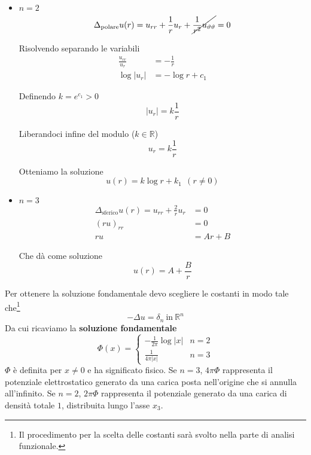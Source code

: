 \documentclass[10pt,a4paper,twoside,openright]{book}
\begin{document}
\begin{itemize}
	\item $\displaystyle n=2$\begin{equation*}
	      \Delta _{\text{polare}} u(r) =u_{rr} +\frac{1}{r} u_{r} +\cancel{\frac{1}{r^{2}} u_{\vartheta \vartheta }} =0
	\end{equation*}
	
	Risolvendo separando le variabili\begin{align*}
	\frac{u_{rr}}{u_{r}} & =-\frac{1}{r}\\
	\log| u_{r}|  & =-\log r+c_{1}
	\end{align*}
	
	Definendo $\displaystyle k=e^{c_{1}}  >0$\begin{equation*}
	| u_{r}| =k\frac{1}{r}
	\end{equation*}
	
	Liberandoci infine del modulo ($\displaystyle k\in \mathbb{R}$)\begin{equation*}
	u_{r} =k\frac{1}{r}
	\end{equation*}
	
	Otteniamo la soluzione\begin{equation*}
	\boxed{u(r) =k\log r+k_{1}} \ \ (r\neq 0)
	\end{equation*}
	\item $\displaystyle n=3$\begin{align*}
	      \Delta _{\text{sferico}} u(r) =u_{rr} +\frac{2}{r} u_{r} & =0\\
	      (ru)_{rr} & =0\\
	      ru & =Ar+B
	\end{align*}
	
	Che dà come soluzione\begin{equation*}
	\boxed{u(r) =A+\frac{B}{r}}
	\end{equation*}
\end{itemize}

Per ottenere la soluzione fondamentale devo scegliere le costanti in modo tale che\footnote{Il procedimento per la scelta delle costanti sarà svolto nella parte di analisi funzionale.} 
\begin{equation*}
	-\Delta u=\delta _{n} \ \text{in} \ \mathbb{R}^{n}
\end{equation*}
Da cui ricaviamo la \textbf{soluzione fondamentale}
\begin{equation*}
	\Phi (x) =\begin{cases}
	-\frac{1}{2\pi }\log| x|  & n=2\\
	\frac{1}{4\pi | x| } & n=3
	\end{cases}
\end{equation*}
$\displaystyle \Phi $ è definita per $\displaystyle x\neq 0$ e ha significato fisico. Se $\displaystyle n=3$, $\displaystyle 4\pi \Phi $ rappresenta il potenziale elettrostatico generato da una carica posta nell'origine che si annulla all'infinito. Se $\displaystyle n=2$, $\displaystyle 2\pi \Phi $ rappresenta il potenziale generato da una carica di densità totale $\displaystyle 1$, distribuita lungo l'asse $\displaystyle x_{3}$.
\end{document}
